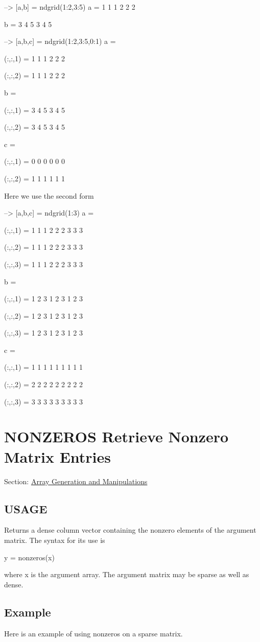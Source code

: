 \begin{DoxyVerbInclude}
--> [a,b] = ndgrid(1:2,3:5)
a = 
 1 1 1 
 2 2 2 

b = 
 3 4 5 
 3 4 5 

--> [a,b,c] = ndgrid(1:2,3:5,0:1)
a = 

(:,:,1) = 
 1 1 1 
 2 2 2 

(:,:,2) = 
 1 1 1 
 2 2 2 

b = 

(:,:,1) = 
 3 4 5 
 3 4 5 

(:,:,2) = 
 3 4 5 
 3 4 5 

c = 

(:,:,1) = 
 0 0 0 
 0 0 0 

(:,:,2) = 
 1 1 1 
 1 1 1 
\end{DoxyVerbInclude}


Here we use the second form


\begin{DoxyVerbInclude}
--> [a,b,c] = ndgrid(1:3)
a = 

(:,:,1) = 
 1 1 1 
 2 2 2 
 3 3 3 

(:,:,2) = 
 1 1 1 
 2 2 2 
 3 3 3 

(:,:,3) = 
 1 1 1 
 2 2 2 
 3 3 3 

b = 

(:,:,1) = 
 1 2 3 
 1 2 3 
 1 2 3 

(:,:,2) = 
 1 2 3 
 1 2 3 
 1 2 3 

(:,:,3) = 
 1 2 3 
 1 2 3 
 1 2 3 

c = 

(:,:,1) = 
 1 1 1 
 1 1 1 
 1 1 1 

(:,:,2) = 
 2 2 2 
 2 2 2 
 2 2 2 

(:,:,3) = 
 3 3 3 
 3 3 3 
 3 3 3 
\end{DoxyVerbInclude}
 \hypertarget{array_nonzeros}{}\section{N\-O\-N\-Z\-E\-R\-O\-S Retrieve Nonzero Matrix Entries}\label{array_nonzeros}
Section\-: \hyperlink{sec_array}{Array Generation and Manipulations} \hypertarget{typecast_dec2bin_USAGE}{}\subsection{U\-S\-A\-G\-E}\label{typecast_dec2bin_USAGE}
Returns a dense column vector containing the nonzero elements of the argument matrix. The syntax for its use is \begin{DoxyVerb}   y = nonzeros(x)
\end{DoxyVerb}
 where {\ttfamily x} is the argument array. The argument matrix may be sparse as well as dense. \hypertarget{variables_struct_Example}{}\subsection{Example}\label{variables_struct_Example}
Here is an example of using {\ttfamily nonzeros} on a sparse matrix.


